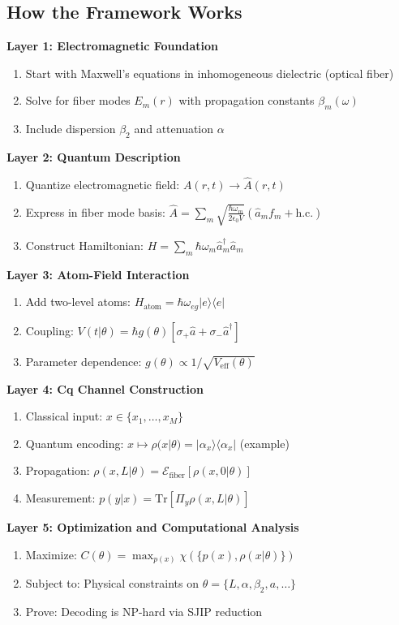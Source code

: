 \documentclass[12pt,a4paper]{article}
\begin{document}
\subsection{How the Framework Works}

\textbf{Layer 1: Electromagnetic Foundation}
\begin{enumerate}
\item Start with Maxwell's equations in inhomogeneous dielectric (optical fiber)
\item Solve for fiber modes $E_m(r)$ with propagation constants $\beta_m(\omega)$
\item Include dispersion $\beta_2$ and attenuation $\alpha$
\end{enumerate}

\textbf{Layer 2: Quantum Description}
\begin{enumerate}
\item Quantize electromagnetic field: $A(r,t) \to \hat{A}(r,t)$
\item Express in fiber mode basis: $\hat{A} = \sum_m \sqrt{\frac{\hbar\omega_m}{2\epsilon_0 V}}(\hat{a}_m f_m + \text{h.c.})$
\item Construct Hamiltonian: $H = \sum_m \hbar\omega_m \hat{a}_m^\dagger \hat{a}_m$
\end{enumerate}

\textbf{Layer 3: Atom-Field Interaction}
\begin{enumerate}
\item Add two-level atoms: $H_{\text{atom}} = \hbar\omega_{eg}|e\rangle\langle e|$
\item Coupling: $V(t|\theta) = \hbar g(\theta)[\sigma_+ \hat{a} + \sigma_- \hat{a}^\dagger]$
\item Parameter dependence: $g(\theta) \propto 1/\sqrt{V_{\text{eff}}(\theta)}$
\end{enumerate}

\textbf{Layer 4: Cq Channel Construction}
\begin{enumerate}
\item Classical input: $x \in \{x_1, \ldots, x_M\}$
\item Quantum encoding: $x \mapsto \rho(x|\theta) = |\alpha_x\rangle\langle\alpha_x|$ (example)
\item Propagation: $\rho(x,L|\theta) = \mathcal{E}_{\text{fiber}}[\rho(x,0|\theta)]$
\item Measurement: $p(y|x) = \text{Tr}[\Pi_y \rho(x,L|\theta)]$
\end{enumerate}

\textbf{Layer 5: Optimization and Computational Analysis}
\begin{enumerate}
\item Maximize: $C(\theta) = \max_{p(x)} \chi(\{p(x), \rho(x|\theta)\})$
\item Subject to: Physical constraints on $\theta = \{L, \alpha, \beta_2, a, \ldots\}$
\item Prove: Decoding is NP-hard via SJIP reduction
\end{enumerate}
\end{document}
